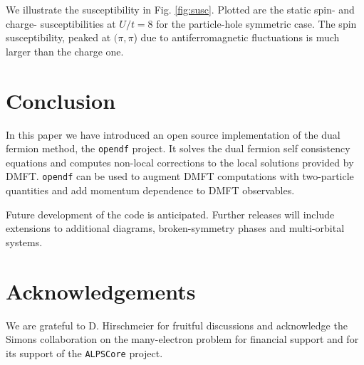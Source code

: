 \documentclass[3p,times,procedia]{elsarticle}
\begin{document}
We illustrate the susceptibility in Fig. \ref{fig:susc}. Plotted are the static spin- and charge- susceptibilities at $U/t = 8$ for the particle-hole symmetric case. The spin susceptibility, peaked at $(\pi,\pi$) due to antiferromagnetic fluctuations is much larger than the charge one. 

\section{Conclusion}\label{sec:conclusions}
In this paper we have introduced an open source implementation of the dual fermion method, the \texttt{opendf} project. It solves the dual fermion self consistency equations and computes non-local corrections to the local solutions provided by DMFT.  \texttt{opendf} can be used to augment DMFT computations with two-particle quantities and add momentum dependence to DMFT observables. 

Future development of the code is anticipated. Further releases will include extensions to additional diagrams, broken-symmetry phases and multi-orbital systems. 

\section*{Acknowledgements}
We are grateful to D. Hirschmeier for fruitful discussions and acknowledge the Simons collaboration on the many-electron problem for financial support and for its support of the \texttt{ALPSCore} project.


\end{document}

